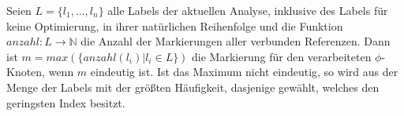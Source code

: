 Seien $L = \{l_1,...,l_n\}$ alle Labels der aktuellen Analyse, inklusive des Labels 
für keine Optimierung, in ihrer natürlichen Reihenfolge und die Funktion 
$anzahl: L \rightarrow \mathbb{N}$ die Anzahl der Markierungen aller verbunden Referenzen. 
Dann ist $m = max(\{anzahl(l_i) | l_i \in L\})$ die Markierung für den verarbeiteten $\phi$-Knoten, 
wenn $m$ eindeutig ist. Ist das Maximum nicht eindeutig, so wird aus der Menge der 
Labels mit der größten Häufigkeit, dasjenige gewählt, welches den geringsten Index besitzt. 